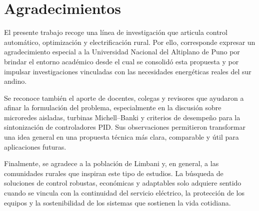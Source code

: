 \chapter*{Agradecimientos}

El presente trabajo recoge una línea de investigación que articula control automático,
optimización y electrificación rural. Por ello, corresponde expresar un agradecimiento
especial a la Universidad Nacional del Altiplano de Puno por brindar el entorno académico
desde el cual se consolidó esta propuesta y por impulsar investigaciones vinculadas con
las necesidades energéticas reales del sur andino.

Se reconoce también el aporte de docentes, colegas y revisores que ayudaron a afinar
la formulación del problema, especialmente en la discusión sobre microredes aisladas,
turbinas Michell--Banki y criterios de desempeño para la sintonización de controladores
PID. Sus observaciones permitieron transformar una idea general en una propuesta técnica
más clara, comparable y útil para aplicaciones futuras.

Finalmente, se agradece a la población de Limbani y, en general, a las comunidades
rurales que inspiran este tipo de estudios. La búsqueda de soluciones de control
robustas, económicas y adaptables solo adquiere sentido cuando se vincula con la
continuidad del servicio eléctrico, la protección de los equipos y la sostenibilidad de
los sistemas que sostienen la vida cotidiana.
